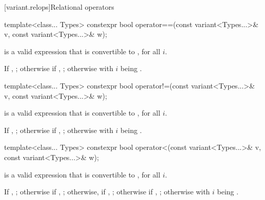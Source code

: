 [variant.relops]{Relational operators}

%
\begin{itemdecl}
template<class... Types>
  constexpr bool operator==(const variant<Types...>& v, const variant<Types...>& w);
\end{itemdecl}

\begin{itemdescr}
\pnum
\constraints
{} is a valid expression that is
convertible to , for all $i$.

\pnum
\returns
If , ;
otherwise if , ;
otherwise  with $i$ being .
\end{itemdescr}

%
\begin{itemdecl}
template<class... Types>
  constexpr bool operator!=(const variant<Types...>& v, const variant<Types...>& w);
\end{itemdecl}

\begin{itemdescr}
\pnum
\constraints
{} is a valid expression that is
convertible to , for all $i$.

\pnum
\returns
If , ;
otherwise if , ;
otherwise  with $i$ being .
\end{itemdescr}

%
\begin{itemdecl}
template<class... Types>
  constexpr bool operator<(const variant<Types...>& v, const variant<Types...>& w);
\end{itemdecl}

\begin{itemdescr}
\pnum
\constraints
{} is a valid expression that is
convertible to , for all $i$.

\pnum
\returns
If , ;
otherwise if , ;
otherwise, if , ;
otherwise if , ;
otherwise  with $i$ being .
\end{itemdescr}


